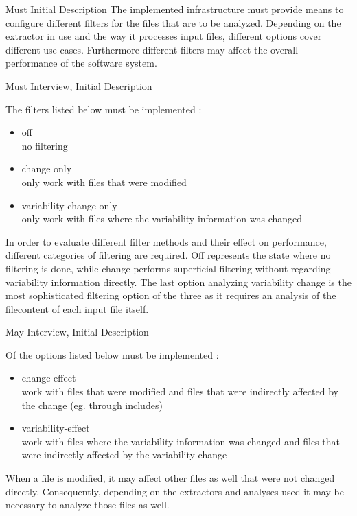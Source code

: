 \documentclass[a4paper]{article}
\begin{document}
\clearpage
\begin{req} \label{req:optimization}
\reqtable
	{Must}  {Initial Description}
	{
	The implemented infrastructure must provide means to configure different filters for the files that are to be analyzed.
    }
	{Depending on the extractor in use and the way it processes input files, different options cover different use cases. Furthermore different filters may affect the overall performance of the software system.}

\begin{subreq}
    \reqtable
	{Must}  {Interview, Initial Description}
	{
	The filters listed below must be implemented \cite{req:optimization}:
	\begin{itemize}
		\item off \\
		no filtering 
	    \item change only \\
	    only work with files that were modified
	    \item variability-change only \\
	     only work with files where the variability information was changed
	\end{itemize}
    }
	{In order to evaluate different filter methods and their effect on performance, different categories of filtering are required. Off represents the state where no filtering is done, while change performs superficial filtering without regarding variability information directly. The last option analyzing variability change is the most sophisticated filtering option of the three as it requires an analysis of the filecontent of each input file itself.}
\end{subreq}

\begin{subreq}
    \reqtable
	{May}  {Interview, Initial Description}
	{
	Of the options listed below must be implemented \cite{req:optimization}:
	\begin{itemize}
		\item change-effect \\
		work with files that were modified and files that were indirectly affected by the change (eg. through includes)
	    \item variability-effect  \\
	    work with files where the variability information was changed and files that were indirectly affected by the variability change
	\end{itemize}
    }
	{When a file is modified, it may affect other files as well that were not changed directly. Consequently, depending on the extractors and analyses used it may be necessary to analyze those files as well.}
\end{subreq}

\end{req}
\end{document}
